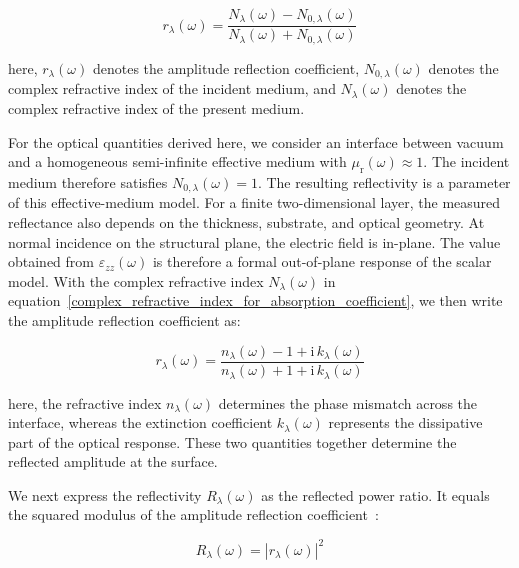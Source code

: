 \begin{equation}
    r_{\lambda}(\omega) =
    \frac{N_{\lambda}(\omega)-N_{0,\lambda}(\omega)}
    {N_{\lambda}(\omega)+N_{0,\lambda}(\omega)}
\label{normal_incidence_amplitude_reflection_coefficient_general}
\end{equation}

here, $r_{\lambda}(\omega)$ denotes the amplitude reflection coefficient,
$N_{0,\lambda}(\omega)$ denotes the complex refractive index of the incident medium,
and $N_{\lambda}(\omega)$ denotes the complex refractive index of the present medium.

For the optical quantities derived here,
we consider an interface between vacuum and a homogeneous semi-infinite effective medium with $\mu_{\mathrm{r}}(\omega)\approx1$.
The incident medium therefore satisfies $N_{0,\lambda}(\omega)=1$.
The resulting reflectivity is a parameter of this effective-medium model.
For a finite two-dimensional layer, the measured reflectance also depends on the thickness, substrate, and optical geometry.
At normal incidence on the structural plane, the electric field is in-plane.
The value obtained from $\varepsilon_{zz}(\omega)$ is therefore a formal out-of-plane response of the scalar model.
With the complex refractive index $N_{\lambda}(\omega)$ in equation~\eqref{complex_refractive_index_for_absorption_coefficient},
we then write the amplitude reflection coefficient as:

\begin{equation}
    r_{\lambda}(\omega) =
    \frac{n_{\lambda}(\omega)-1+\mathrm{i}\,k_{\lambda}(\omega)}
    {n_{\lambda}(\omega)+1+\mathrm{i}\,k_{\lambda}(\omega)}
\label{normal_incidence_amplitude_reflection_coefficient_vacuum_interface}
\end{equation}

here, the refractive index $n_{\lambda}(\omega)$ determines the phase mismatch across the interface,
whereas the extinction coefficient $k_{\lambda}(\omega)$ represents the dissipative part of the optical response.
These two quantities together determine the reflected amplitude at the surface.

We next express the reflectivity $R_{\lambda}(\omega)$ as the reflected power ratio.
It equals the squared modulus of the amplitude reflection coefficient~\cite{born2013principles,wooten2013optical,dressel2002electrodynamics}:

\begin{equation}
    R_{\lambda}(\omega)
    = \left|r_{\lambda}(\omega)\right|^2
\label{reflectivity_from_amplitude_reflection_coefficient}
\end{equation}

